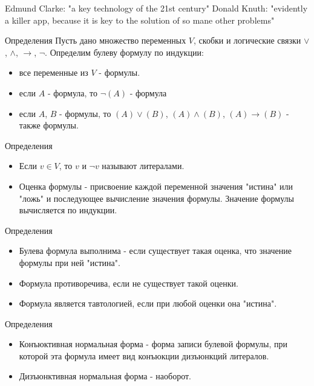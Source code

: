 \documentclass{beamer}
\begin{document}
\begin{frame}
Edmund Clarke: "a key technology of the 21st century"\newline
Donald Knuth: "evidently a killer app, because it is key to the solution of so mane other problems"\newline
\end{frame}

\begin{frame}{Определения}
Пусть дано множество переменных $V$, скобки и логические связки $\vee$, $\wedge$, $\rightarrow$, $\lnot$. Определим булеву
формулу по индукции:
\begin{itemize}
\item все переменные из $V$ - формулы.
\item если $A$ - формула, то $\lnot(A)$ - формула
\item если $A$, $B$ - формулы, то $(A)\vee(B)$, $(A)\wedge(B)$, $(A)\rightarrow(B)$ - также формулы.
\end{itemize}
\end{frame}

\begin{frame}{Определения}
\begin{itemize}
\item Если $v \in V$, то $v$ и $\lnot v$ называют литералами.
\item Оценка формулы - присвоение каждой переменной значения "истина" или "ложь" и последующее вычисление значения формулы. Значение
формулы вычисляется по индукции.
\end{itemize}
\end{frame}

\begin{frame}{Определения}
\begin{itemize}
\item Булева формула выполнима - если существует такая оценка, что значение формулы при ней "истина".
\item Формула противоречива, если не
существует такой оценки.
\item Формула является тавтологией, если при любой оценки она "истина".
\end{itemize}
\end{frame}

\begin{frame}{Определения}
\begin{itemize}
\item Конъюктивная нормальная форма - форма записи булевой формулы, при которой эта формула имеет вид конъюкции дизъюнкций
литералов.
\item Дизъюнктивная нормальная форма - наоборот.
\end{itemize}
\end{frame}
\end{document}

